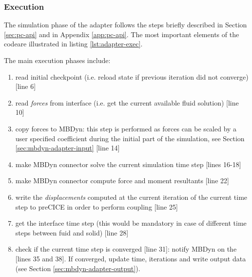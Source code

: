 \subsubsection{Execution}

The simulation phase of the adapter follows the steps briefly described in Section \ref{sec:pc-api} and in Appendix \ref{app:pc-api}. The most important elements of the codeare  illustrated in listing \ref{lst:adapter-exec}.

The main execution phases include:

\begin{enumerate}
    \item read initial checkpoint (i.e. reload state if previous iteration did not converge) [line 6]
    \item read \textit{forces} from interface (i.e. get the current available fluid solution) [line 10]
    \item copy forces to MBDyn: this step is performed as forces can be scaled by a user specified coefficient during the initial part of the simulation, see Section \ref{sec:mbdyn-adapter-input} [line 14]
    \item make MBDyn connector solve the current simulation time step [lines 16-18]
    \item make MBDyn connector compute force and moment resultants [line 22]
    \item write the \textit{displacements} computed at the current iteration of the current time step to preCICE in order to perform coupling [line 25]
    \item get the interface time step (this would be mandatory in case of different time steps between fuid and solid) [line 28]
    \item check if the current time step is converged [line 31]:
    notify MBDyn on the [lines 35 and 38]. If converged, update time, iterations and write output data (see Section \ref{sec:mbdyn-adapter-output}).
\end{enumerate}

